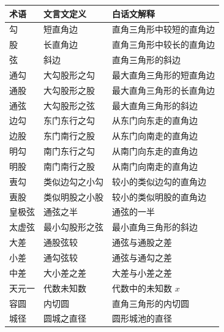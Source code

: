 \documentclass[11pt,a4paper]{article}
\begin{document}
\begin{center}
\begin{tabular}{|p{}|p{}|p{}|}
\hline
\rowcolor{volumecolor!20}
\textbf{\textcolor{volumecolor}{术语}} & \textbf{\textcolor{classicalcolor}{文言文定义}} & \textbf{\textcolor{moderncolor}{白话文解释}} \\
\hline
勾 & 短直角边 & 直角三角形中较短的直角边 \\
\hline
股 & 长直角边 & 直角三角形中较长的直角边 \\
\hline
弦 & 斜边 & 直角三角形的斜边 \\
\hline
通勾 & 大勾股形之勾 & 最大直角三角形的短直角边 \\
\hline
通股 & 大勾股形之股 & 最大直角三角形的长直角边 \\
\hline
通弦 & 大勾股形之弦 & 最大直角三角形的斜边 \\
\hline
边勾 & 东门东行之勾 & 从东门向东走的直角边 \\
\hline
边股 & 东门南行之股 & 从东门向南走的直角边 \\
\hline
明勾 & 南门东行之勾 & 从南门向东走的直角边 \\
\hline
明股 & 南门南行之股 & 从南门向南走的直角边 \\
\hline
叀勾 & 类似边勾之小勾 & 较小的类似边勾的直角边 \\
\hline
叀股 & 类似明股之小股 & 较小的类似明股的直角边 \\
\hline
皇极弦 & 通弦之半 & 通弦的一半 \\
\hline
太虚弦 & 最小勾股形之弦 & 最小直角三角形的斜边 \\
\hline
大差 & 通股弦较 & 通弦与通股之差 \\
\hline
小差 & 通勾弦较 & 通弦与通勾之差 \\
\hline
中差 & 大小差之差 & 大差与小差之差 \\
\hline
天元一 & 代数未知数 & 代数中的未知数 $x$ \\
\hline
容圆 & 内切圆 & 直角三角形的内切圆 \\
\hline
城径 & 圆城之直径 & 圆形城池的直径 \\
\hline
\end{tabular}
\end{center}
\end{document}

